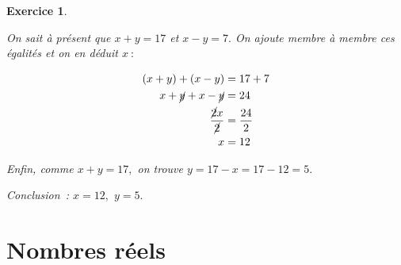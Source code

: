 \documentclass[10pt]{article}
\newtheorem{exo}{Exercice}
\begin{document}
\begin{exo}
\begin{enumerate}
\medskip

On sait à présent que $x+y=17$ et $x-y=7.$ On ajoute membre à membre ces égalités et on en déduit $x~:$

\begin{align*}
(x+y)+(x-y)&=17+7\\
x+\cancel{y}+x-\cancel{y}&=24\\
\frac{\cancel{2}x}{\cancel{2}}&=\frac{24}{2}\\
x&=12
\end{align*}

Enfin, comme $x+y=17,$ on trouve $y=17-x=17-12=5.$

Conclusion~: $x=12,$ $y=5.$


\end{enumerate}
\end{exo}





\section{Nombres réels}
\end{document}
